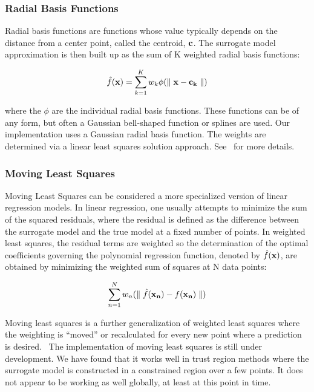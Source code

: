 \subsubsection{Radial Basis Functions}\label{models:surf:rbf}

Radial basis functions are functions whose value typically depends on the 
distance from a center point, called the centroid, ${\bf c}$. 
The surrogate model approximation is then built up as the sum of K 
weighted radial basis functions: 

\begin{equation}
  \hat{f}({\bf x})=\sum_{k=1}^{K}w_{k}\phi({\parallel {\bf x} - {\bf c_{k}} \parallel})
  \label{models:surf:equation11}  
\end{equation}

where the $\phi$ are the individual radial basis functions.  
These functions can be of any form, but often a Gaussian bell-shaped 
function or splines are used.  
Our implementation uses a Gaussian radial basis function. 
The weights are determined via a linear least squares solution approach.
See~\cite{Orr96} for more details.

\subsubsection{Moving Least Squares}\label{models:surf:mls}

Moving Least Squares can be considered a more specialized 
version of linear regression models.  In linear regression, 
one usually attempts to minimize the sum of the squared residuals, 
where the residual is defined as the difference between the 
surrogate model and the true model at a fixed number of points. 
In weighted least squares, the residual terms are weighted so the 
determination of the optimal coefficients governing the polynomial 
regression function, denoted by $\hat{f}({\bf x})$, are obtained by 
minimizing the weighted sum of squares at N data points: 

\begin{equation}
  \sum_{n=1}^{N}w_{n}({\parallel \hat{f}({\bf x_{n}})-f({\bf x_{n}})\parallel})
  \label{models:surf:equation12}  
\end{equation}

Moving least squares is a further generalization of weighted least squares
where the weighting is ``moved'' or recalculated for every new point where 
a prediction is desired.~\cite{Nea04}  The implementation of 
moving least squares 
is still under development.  We have found that it works well 
in trust region methods where the surrogate model is constructed in 
a constrained region over a few points.  It does not appear to be working 
as well globally, at least at this point in time.

